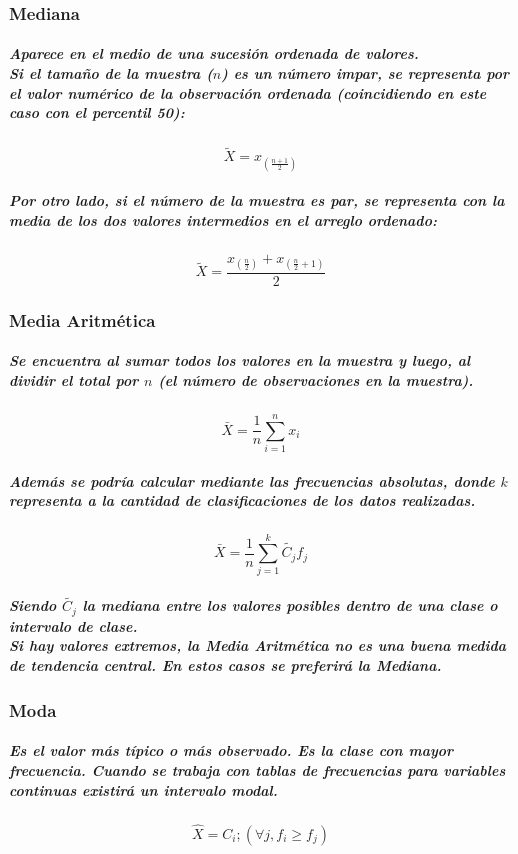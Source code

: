 \subsubsection{Mediana}
\subparagraph{
Aparece en el medio de una sucesión ordenada de valores.\\Si el tamaño de la muestra ($n$) es un número impar, se representa por el valor numérico de la observación ordenada (coincidiendo en este caso con el percentil 50):
}
\begin{equation}
\tilde{X}=x_{(\frac{n+1}{2})}
\end{equation}
\subparagraph{
Por otro lado, si el número de la muestra es par, se representa con la media de los dos valores intermedios en el arreglo ordenado:
}
\begin{equation}
\tilde{X}=\frac{x_{(\frac{n}{2})} + x_{(\frac{n}{2}+1)}}{2}
\end{equation}

\subsubsection{Media Aritmética}
\subparagraph{
Se encuentra al sumar todos los valores en la muestra y luego, al dividir el total por $n$ (el número de observaciones en la muestra).
}
\begin{equation}
\bar{X} = \frac{1}{n}\sum _{i=1}^n x_{i}
\end{equation}
\subparagraph{
Además se podría calcular mediante las frecuencias absolutas, donde $k$ representa a la cantidad de clasificaciones de los datos realizadas.
}
\begin{equation}
\bar{X} = \frac{1}{n}\sum _{j=1}^k \tilde{C_{j}} f_{j}
\end{equation}
\subparagraph{
Siendo $\tilde{C_{j}}$ la mediana entre los valores posibles dentro de una clase o intervalo de clase.\\
Si hay valores extremos, la Media Aritmética no es una buena medida de tendencia central. En estos casos se preferirá la Mediana.
}

\subsubsection{Moda}
\subparagraph{
Es el valor más típico o más observado. Es la clase con mayor frecuencia. Cuando se trabaja con tablas de frecuencias para variables continuas existirá un intervalo modal.
}
\begin{equation}
\hat{X} = C_{i}; (\forall j , f_{i} \geq f_{j})
\end{equation}



